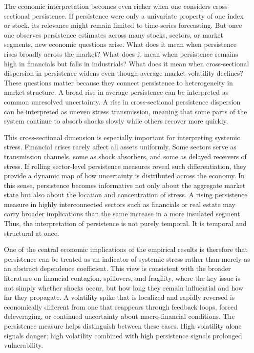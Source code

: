 \documentclass[12pt]{article}
\begin{document}
The economic interpretation becomes even richer when one considers cross-sectional persistence. If persistence were only a univariate property of one index or stock, its relevance might remain limited to time-series forecasting. But once one observes persistence estimates across many stocks, sectors, or market segments, new economic questions arise. What does it mean when persistence rises broadly across the market? What does it mean when persistence remains high in financials but falls in industrials? What does it mean when cross-sectional dispersion in persistence widens even though average market volatility declines? These questions matter because they connect persistence to heterogeneity in market structure. A broad rise in average persistence can be interpreted as common unresolved uncertainty. A rise in cross-sectional persistence dispersion can be interpreted as uneven stress transmission, meaning that some parts of the system continue to absorb shocks slowly while others recover more quickly.

This cross-sectional dimension is especially important for interpreting systemic stress. Financial crises rarely affect all assets uniformly. Some sectors serve as transmission channels, some as shock absorbers, and some as delayed receivers of stress. If rolling sector-level persistence measures reveal such differentiation, they provide a dynamic map of how uncertainty is distributed across the economy. In this sense, persistence becomes informative not only about the aggregate market state but also about the location and concentration of stress. A rising persistence measure in highly interconnected sectors such as financials or real estate may carry broader implications than the same increase in a more insulated segment. Thus, the interpretation of persistence is not purely temporal. It is temporal and structural at once.

One of the central economic implications of the empirical results is therefore that persistence can be treated as an indicator of systemic stress rather than merely as an abstract dependence coefficient. This view is consistent with the broader literature on financial contagion, spillovers, and fragility, where the key issue is not simply whether shocks occur, but how long they remain influential and how far they propagate. A volatility spike that is localized and rapidly reversed is economically different from one that reappears through feedback loops, forced deleveraging, or continued uncertainty about macro-financial conditions. The persistence measure helps distinguish between these cases. High volatility alone signals danger; high volatility combined with high persistence signals prolonged vulnerability.
\end{document}
